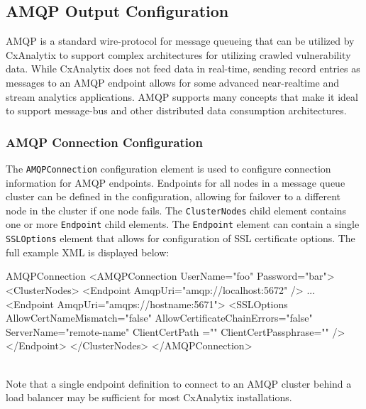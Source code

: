 \subsection{AMQP Output Configuration}\label{sec:amqp_config}

AMQP is a standard wire-protocol for message queueing that can be utilized by CxAnalytix to support complex architectures for utilizing crawled 
vulnerability data.  While CxAnalytix does not feed data in real-time, sending record entries as messages to an AMQP endpoint allows for some
advanced near-realtime and stream analytics applications.  AMQP supports many concepts that make it ideal to support message-bus and other
distributed data consumption architectures.




\subsubsection{AMQP Connection Configuration}

The \texttt{AMQPConnection} configuration element is used to configure connection information for AMQP endpoints.  Endpoints for all nodes in a message queue cluster
can be defined in the configuration, allowing for failover to a different node in the cluster if one node fails.  The \texttt{ClusterNodes} child element
contains one or more \texttt{Endpoint} child elements.  The \texttt{Endpoint} element can contain a single \texttt{SSLOptions} element that allows
for configuration of SSL certificate options.  The full example XML is displayed below:\\


\begin{xml}{AMQPConnection}{\expandsenv\encrypts}{}
<AMQPConnection UserName="foo" Password="bar">
    <ClusterNodes>
        <Endpoint 
            AmqpUri="amqp://localhost:5672" 
            />
        ...
        <Endpoint 
            AmqpUri="amqps://hostname:5671">
            <SSLOptions 
                AllowCertNameMismatch="false" 
                AllowCertificateChainErrors="false" 
                ServerName="remote-name" 
                ClientCertPath ="" 
                ClientCertPassphrase=""
                />
        </Endpoint>
    </ClusterNodes>
</AMQPConnection>
\end{xml}

\noindent\\Note that a single endpoint definition to connect to an AMQP cluster behind a load balancer may be sufficient for most CxAnalytix installations.

